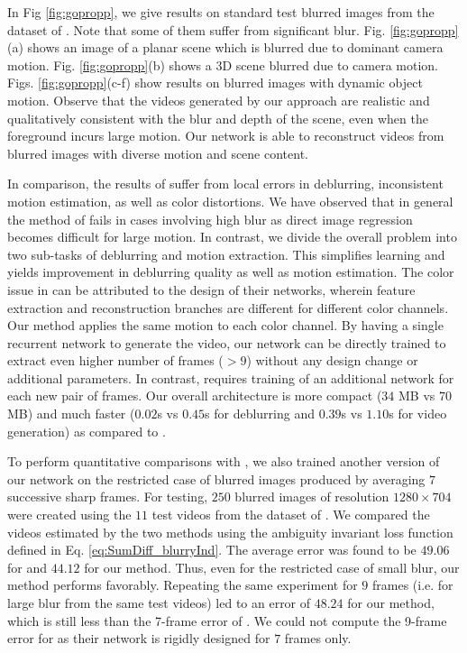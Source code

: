 \documentclass[10pt,twocolumn,letterpaper]{article}
\begin{document}
In Fig  \ref{fig:gopropp}, we give results on standard test blurred images from the dataset of \cite{nah2017deep}. Note that some of them suffer from significant blur. Fig. \ref{fig:gopropp}(a) shows an image of a planar scene which is blurred due to dominant camera motion. Fig. \ref{fig:gopropp}(b) shows a 3D scene blurred due to camera motion. Figs. \ref{fig:gopropp}(c-f) show results on blurred images with dynamic object motion. Observe that the videos generated by our approach are realistic and qualitatively consistent with the blur and depth of the scene, even when the foreground incurs large motion. Our network is able to reconstruct videos from blurred images with diverse motion and scene content.

In comparison, the results of \cite{jin2018learning} suffer from local errors in deblurring, inconsistent motion estimation, as well as color distortions. We have observed that in general the method of \cite{jin2018learning} fails in cases involving high blur as direct image regression becomes difficult for large motion. In contrast, we divide the overall problem into two sub-tasks of deblurring and motion extraction. This simplifies learning and yields improvement in deblurring quality as well as motion estimation. The color issue in \cite{jin2018learning} can be attributed to the design of their networks, wherein feature extraction and reconstruction branches are different for different color channels. Our method applies the same motion to each color channel. By having a single recurrent network to generate the video, our network can be directly trained to extract even higher number of frames ($>9$) without any design change or additional parameters. In contrast, \cite{jin2018learning} requires training of an additional network for each new pair of frames. Our overall architecture is more compact ($34$ MB vs $70$ MB) and much faster ($0.02$s vs $0.45$s for deblurring and $0.39$s vs $1.10$s for video generation) as compared to \cite{jin2018learning}. 

To perform quantitative comparisons with \cite{jin2018learning}, we also trained another version of our network on the restricted case of blurred images produced by averaging $7$ successive sharp frames. For testing, $250$ blurred images of resolution $1280 \times 704$ were created using the $11$ test videos from the dataset of \cite{nah2017deep}. We compared the videos estimated by the two methods using the ambiguity invariant loss function defined in Eq. \ref{eq:SumDiff_blurryInd}. The average error was found to be $49.06$ for \cite{jin2018learning} and $44.12$ for our method. Thus, even for the restricted case of small blur, our method performs favorably. Repeating the same experiment for $9$ frames (i.e. for large blur from the same test videos) led to an error of $48.24$ for our method, which is still less than the 7-frame error of \cite{jin2018learning}. We could not compute the 9-frame error for \cite{jin2018learning} as their network is rigidly designed for $7$ frames only.
\end{document}
